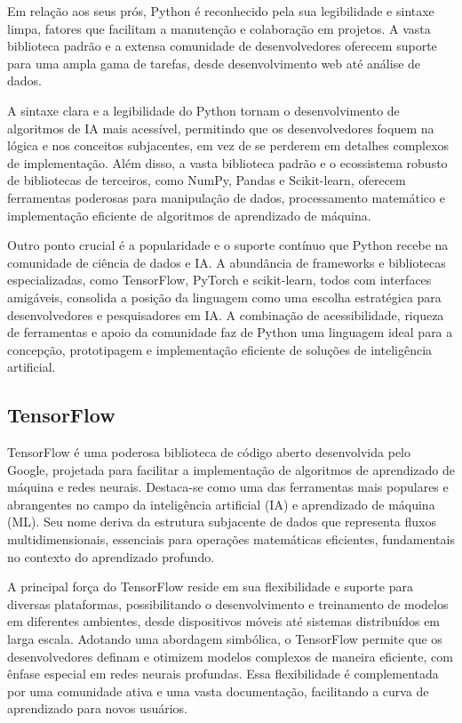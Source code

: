 Em relação aos seus prós, Python é reconhecido pela sua legibilidade e sintaxe limpa, fatores que facilitam a manutenção e colaboração em projetos. A vasta biblioteca padrão e a extensa comunidade de desenvolvedores oferecem suporte para uma ampla gama de tarefas, desde desenvolvimento web até análise de dados.

A sintaxe clara e a legibilidade do Python tornam o desenvolvimento de algoritmos de IA mais acessível, permitindo que os desenvolvedores foquem na lógica e nos conceitos subjacentes, em vez de se perderem em detalhes complexos de implementação. Além disso, a vasta biblioteca padrão e o ecossistema robusto de bibliotecas de terceiros, como NumPy, Pandas e Scikit-learn, oferecem ferramentas poderosas para manipulação de dados, processamento matemático e implementação eficiente de algoritmos de aprendizado de máquina.

Outro ponto crucial é a popularidade e o suporte contínuo que Python recebe na comunidade de ciência de dados e IA. A abundância de frameworks e bibliotecas especializadas, como TensorFlow, PyTorch e scikit-learn, todos com interfaces amigáveis, consolida a posição da linguagem como uma escolha estratégica para desenvolvedores e pesquisadores em IA. A combinação de acessibilidade, riqueza de ferramentas e apoio da comunidade faz de Python uma linguagem ideal para a concepção, prototipagem e implementação eficiente de soluções de inteligência artificial.

\subsection{TensorFlow}

TensorFlow é uma poderosa biblioteca de código aberto desenvolvida pelo Google, projetada para facilitar a implementação de algoritmos de aprendizado de máquina e redes neurais. Destaca-se como uma das ferramentas mais populares e abrangentes no campo da inteligência artificial (IA) e aprendizado de máquina (ML). Seu nome deriva da estrutura subjacente de dados que representa fluxos multidimensionais, essenciais para operações matemáticas eficientes, fundamentais no contexto do aprendizado profundo.

A principal força do TensorFlow reside em sua flexibilidade e suporte para diversas plataformas, possibilitando o desenvolvimento e treinamento de modelos em diferentes ambientes, desde dispositivos móveis até sistemas distribuídos em larga escala. Adotando uma abordagem simbólica, o TensorFlow permite que os desenvolvedores definam e otimizem modelos complexos de maneira eficiente, com ênfase especial em redes neurais profundas. Essa flexibilidade é complementada por uma comunidade ativa e uma vasta documentação, facilitando a curva de aprendizado para novos usuários.

